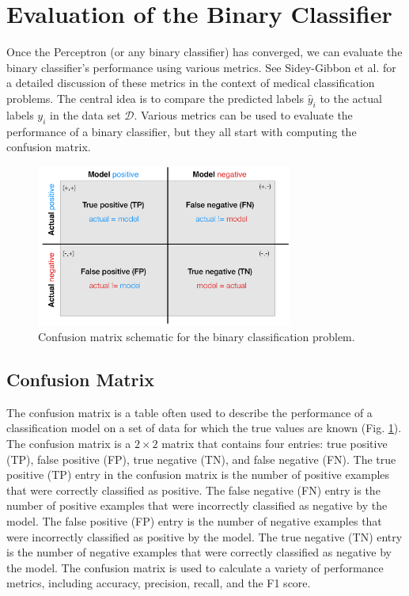 \documentclass{article}[11pt]
\begin{document}
\section{Evaluation of the Binary Classifier}
Once the Perceptron (or any binary classifier) has converged, we can evaluate the binary classifier's performance using various metrics.
See Sidey-Gibbon et al. \cite{SG2019} for a detailed discussion of these metrics in the context of medical classification problems.
The central idea is to compare the predicted labels $\hat{y}_{i}$ to the actual labels $y_{i}$ in the data set $\mathcal{D}$. 
Various metrics can be used to evaluate the performance of a binary classifier, but they all start with computing the confusion matrix.

\begin{figure}
    \centering
	\includegraphics[width=0.75\textwidth]{./figs/Fig-BinaryConfusionMatrix.pdf}
	\caption{Confusion matrix schematic for the binary classification problem.}\label{fig:binaryconfusionmatrx}
\end{figure}

\subsection{Confusion Matrix}
The confusion matrix is a table often used to describe the performance of a classification model on a set of data for which the true values are known (Fig. \ref{fig:binaryconfusionmatrx}).
The confusion matrix is a $2\times{2}$ matrix that contains four entries: true positive (TP), false positive (FP), true negative (TN), and false negative (FN).
The true positive (TP) entry in the confusion matrix is the number of positive examples that were correctly classified as positive.
The false negative (FN) entry is the number of positive examples that were incorrectly classified as negative by the model.
The false positive (FP) entry is the number of negative examples that were incorrectly classified as positive by the model.
The true negative (TN) entry is the number of negative examples that were correctly classified as negative by the model.
The confusion matrix is used to calculate a variety of performance metrics, including accuracy, precision, recall, and the F1 score.
\end{document}
